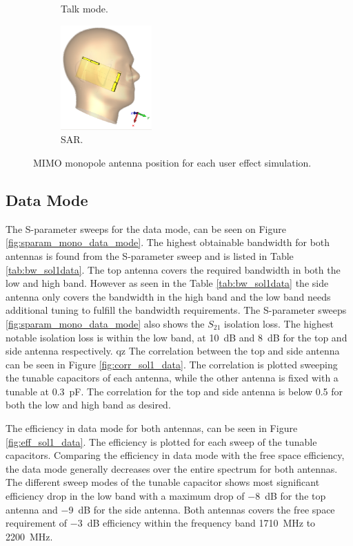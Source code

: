 \begin{figure}[htbp]
\begin{subfigure}[b]{0.24\linewidth}
        \caption{Talk mode.}
    \end{subfigure}
    \begin{subfigure}[b]{0.24\linewidth}
        \centering \includegraphics[width=\linewidth,height=4cm,keepaspectratio]{img/tech_sol/monopole/sar/3d_sar.PNG}
        \caption{SAR.}
    \end{subfigure}
    \caption{MIMO monopole antenna position for each user effect simulation.}
    \label{fig:sol1_monoant_positions}
\end{figure}

\FloatBarrier
\subsection{Data Mode}
The S-parameter sweeps for the data mode, can be seen on Figure \ref{fig:sparam_mono_data_mode}. The highest obtainable bandwidth for both antennas is found from the S-parameter sweep and is listed in Table \ref{tab:bw_sol1data}. The top antenna covers the required bandwidth in both the low and high band. However as seen in the Table \ref{tab:bw_sol1data} the side antenna only covers the bandwidth in the high band and the low band needs additional tuning to fulfill the bandwidth requirements. The S-parameter sweeps \ref{fig:sparam_mono_data_mode} also shows the $S_{21}$ isolation loss. The highest notable isolation loss is within the low band, at \SI{10}{dB} and \SI{8}{dB} for the top and side antenna respectively.       
qz
The correlation between the top and side antenna can be seen in Figure \ref{fig:corr_sol1_data}. The correlation is plotted sweeping the tunable capacitors of each antenna, while the other antenna is fixed with a tunable at \SI{0.3}{pF}. The correlation for the top and side antenna is below 0.5 for both the low and high band as desired.

The efficiency in data mode for both antennas, can be seen in Figure \ref{fig:eff_sol1_data}. The efficiency is plotted for each sweep of the tunable capacitors. Comparing the efficiency in data mode with the free space efficiency, the data mode generally decreases over the entire spectrum for both antennas. The different sweep modes of the tunable capacitor shows most significant efficiency drop in the low band with a maximum drop of \SI{-8}{dB} for the top antenna and \SI{-9}{dB} for the side antenna. Both antennas covers the free space requirement of \SI{-3}{dB} efficiency within the frequency band \SI{1710}{MHz} to \SI{2200}{MHz}. 

